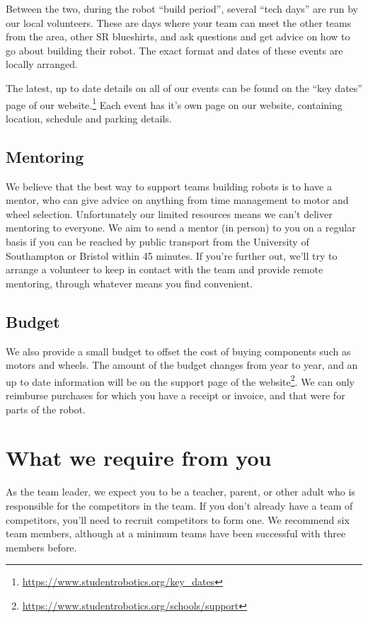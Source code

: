 \documentclass[a4paper]{article}
\begin{document}
Between the two, during the robot ``build period'', several ``tech
days'' are run by our local volunteers.  These are days where your team can
meet the other teams from the area, other SR blueshirts, and ask questions and
get advice on how to go about building their robot. The exact format and dates
of these events are locally arranged.

The latest, up to date details on all of our events can be found on the ``key
dates'' page of our
website.\footnote{\url{https://www.studentrobotics.org/key_dates}} Each event
has it's own page on our website, containing location, schedule and parking details.

\subsection*{Mentoring}

We believe that the best way to support teams building robots is to have a
mentor, who can give advice on anything from time management to motor and wheel
selection. Unfortunately our limited resources means we can't deliver mentoring
to everyone. We aim to send a mentor (in person) to you on a regular basis if
you can be reached by public transport from the University of Southampton or
Bristol within 45 minutes. If you're further out, we'll try to arrange a
volunteer to keep in contact with the team and provide remote mentoring,
through whatever means you find convenient.

\subsection*{Budget}

We also provide a small budget to offset the cost of buying components such as
motors and wheels. The amount of the budget changes from year to year, and an
up to date information will be on the support page of the
website\footnote{\url{https://www.studentrobotics.org/schools/support}}. We
can only reimburse purchases for which you have a receipt or invoice, and that
were for parts of the robot.

\section*{What we require from you}

As the team leader, we expect you to be a teacher, parent, or other adult who
is responsible for the competitors in the team. If you don't already have a
team of competitors, you'll need to recruit competitors to form one. We
recommend six team members, although at a minimum teams have been successful
with three members before.
\end{document}
